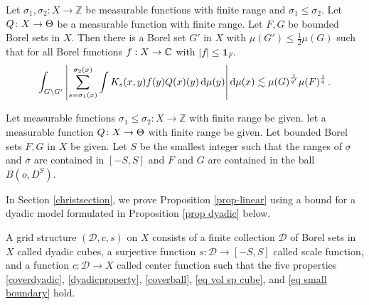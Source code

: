 \begin{prop}\label{prop-linear}
Let ${\sigma_1},\sigma_2\colon X\to \mathbb{Z}$ be measurable functions with finite range and ${\sigma_1}\leq  \sigma_2$. Let ${Q}\colon X\to \Theta$ be a measurable function with finite range. Let $F,G$ be bounded Borel sets in $X$. Then there is a Borel set $G'$ in $X$ with $\mu(G')\leq \frac 12 \mu(G)$ such that
for all Borel functions $f:X\to \mathbb{C}$ with $|f|\le \mathbf{1}_F$.
\begin{multline}\label{eq-linearized}
\int_{G \setminus G'} \left|\sum_{s={\sigma_1}(x)}^{{\sigma_2}(x)} \int K_s(x,y) f(y) {Q}(x)(y)  \, \mathrm{d}\mu(y) \right| \mathrm{d}\mu(x)  \lesssim \mu(G)^{\frac 1{q'}}
 \mu(F)^{\frac 1 q}\,.
\end{multline}
\end{prop}
Let measurable functions ${\sigma_1}\leq \sigma_2\colon X\to \mathbb{Z}$ with finite range be given. let a measurable function
${Q}\colon X\to \Theta$ with finite range
be given.
Let bounded Borel sets $F,G$ in $X$ be given.
Let $S$ be the smallest integer such that the ranges of
$\underline{\sigma}$ and $ \overline\sigma$ are contained in $[-S,S]$ and $F$ and $G$ are contained
in the ball $B(o, D^S)$.


In Section \ref{christsection},
we prove Proposition \ref{prop-linear}
 using  a
bound for a dyadic model formulated in Proposition
\ref{prop dyadic} below.


A grid structure $(\mathcal{D}, c, s)$ on $X$ consists of a finite collection $\mathcal{D}$  of Borel sets in $X$ called dyadic cubes, a surjective function  $s\colon \mathcal{D}\to [-S, S]$
called scale function,
and a function $c:\mathcal{D}\to X$
called center function such that the five properties
\eqref{coverdyadic},
\eqref{dyadicproperty}, \eqref{coverball},
\eqref{eq vol sp cube}, and \eqref{eq small boundary}
hold.

